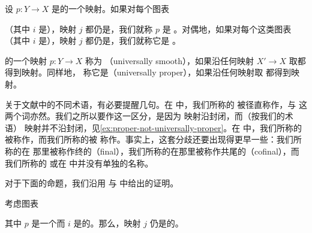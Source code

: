 \begin{definition}\label{def:smooth-proper}
设 $p\colon Y \to X$ 是\trSimplicialSets{}的一个映射。如果对每个\trPullback{}图表
\begin{center}
\end{center}
（其中 $i$ 是\trCofinal{}），映射 $j$ 都仍是\trCofinal{}，我们就称 $p$ 是%
\emph{\trSmooth{}}。对偶地，如果对每个这类\trPullback{}图表（其中 $i$
是\trCoinitial{}），映射 $j$ 都仍是\trCoinitial{}，我们就称它是%
\emph{\trProper{}}。
\end{definition}

\begin{definition}\label{def:universally-smooth-proper}
\trSimplicialSets{}的一个映射 $p\colon Y \to X$ 称为%
\emph{\trUniversallySmooth{}}（universally smooth），如果沿任何映射
$X' \to X$ 取\trPullback{}都得到\trSmooth{}映射。同样地，
称它是\emph{\trUniversallyProper{}}（universally proper），如果沿任何映射取%
\trPullback{}都得到\trProper{}映射。
\end{definition}

\begin{remark}\label{rem:terminology-warning}
关于文献中的不同术语，有必要提醒几句。在 \cite{Lur09} 中，我们所称的%
\trUniversallySmooth{}被径直称作\trSmooth{}，\trProper{}与%
\trUniversallyProper{}这两个词亦然。我们之所以要作这一区分，是因为%
\trUniversallyProper{}映射沿\trPullback{}封闭，而（按我们的术语）\trProper{}%
映射并不沿\trPullback{}封闭，见\cref{ex:proper-not-universally-proper}。在 \cite{Cis19,Ngu18} 中，我们所称的%
\trUniversallySmooth{}被称作\trProper{}，而我们所称的\trUniversallyProper{}被
称作\trSmooth{}。事实上，这套分歧还要出现得更早一些：我们所称的\trCofinal{}在
那里被称作终的（final），我们所称的\trCoinitial{}在那里被称作共尾的（cofinal），而我们所称的%
\trSmooth{}或\trProper{}在 \cite{Cis19,Ngu18} 中并没有单独的名称。
\end{remark}

对于下面的命题，我们沿用 \cite[2.3.23]{Ngu18} 与 \cite{Cis19} 中给出的证明。

\begin{proposition}\label{prop:base-change-right-anodyne}
考虑\trPullback{}图表
\begin{center}
\end{center}
其中 $p$ 是一个\trLeftFibration{}而 $i$ 是\trRightAnodyne{}的。那么，映射 $j$
仍是\trRightAnodyne{}的。
\end{proposition}

